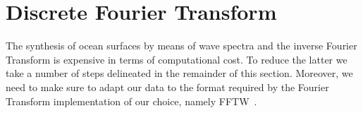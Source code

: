 %
%

\section{Discrete Fourier Transform}
\label{sec:discrete_fourier_transform}
The synthesis of ocean surfaces by means of wave spectra and the inverse Fourier
Transform is expensive in terms of computational cost. To reduce the latter we
take a number of steps delineated in the remainder of this section.
Moreover, we need to make sure to adapt our data to the format required by the
Fourier Transform implementation of our choice, namely FFTW~\citep{FFTW05}.
